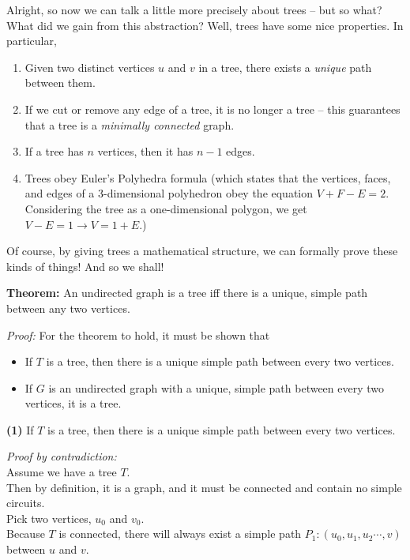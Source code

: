 \documentclass[a4paper,10pt]{report}
\begin{document}
Alright, so now we can talk a little more precisely about trees -- but so what? What did we gain from this abstraction? Well, trees have some nice properties. In particular,
\begin{enumerate}
	\item Given two distinct vertices $u$ and $v$ in a tree, there exists a \textit{unique} path between them.
	\item If we cut or remove any edge of a tree, it is no longer a tree -- this guarantees that a tree is a \textit{minimally connected} graph.
	\item If a tree has $n$ vertices, then it has $n-1$ edges.
	\item Trees obey Euler's Polyhedra formula (which states that the vertices, faces, and edges of a 3-dimensional polyhedron obey the equation $V+F-E=2$. Considering the tree as a one-dimensional polygon, we get $V-E=1\rightarrow V=1+E$.)
\end{enumerate}


Of course, by giving trees a mathematical structure, we can formally prove these kinds of things! And so we shall!

\hrulefill

\noindent\textbf{Theorem: }An undirected graph is a tree iff there is a unique, simple path between any two vertices.

\textit{Proof:} For the theorem to hold, it must be shown that
\begin{itemize}
	\item If $T$ is a tree, then there is a unique simple path between every two vertices.
	\item If $G$ is an undirected graph with a unique, simple path between every two vertices, it is a tree.
\end{itemize}


\textbf{(1)} If $T$ is a tree, then there is a unique simple path between every two vertices.

\textit{Proof by contradiction:}\\

Assume we have a tree $T$.\\

Then by definition, it is a graph, and it must be connected and contain no simple circuits.\\

Pick two vertices, $u_0$ and $v_0$.\\

Because $T$ is connected, there will always exist a simple path $P_1:(u_0, u_1, u_2\cdots,v)$ between $u$ and $v$.\\
\end{document}
